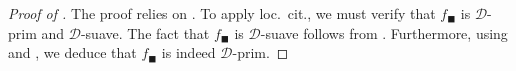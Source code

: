 \documentclass[oneside, hidelinks, 12pt, a4paper,reqno]{amsart}
\theoremstyle{plain}
\theoremstyle{definition}
\theoremstyle{plain}
\newtheorem{proposition}[proposition]{Proposition}
\newcommand{\Solid}{\blacksquare}
\begin{document}
\begin{proof}[Proof of ]
    The proof relies on . To apply loc.\ cit., we must verify that $f_\Solid$ is $\mathscr{D}$-prim and $\mathscr{D}$-suave. The fact that $f_\Solid$ is $\mathscr{D}$-suave follows from \cite[Theorem 1.62]{mikami2026finitenessdualitycohomologyvarphigammamodules}. Furthermore, using  and , we deduce that $f_\Solid$ is indeed $\mathscr{D}$-prim.
\end{proof}

\end{document}
